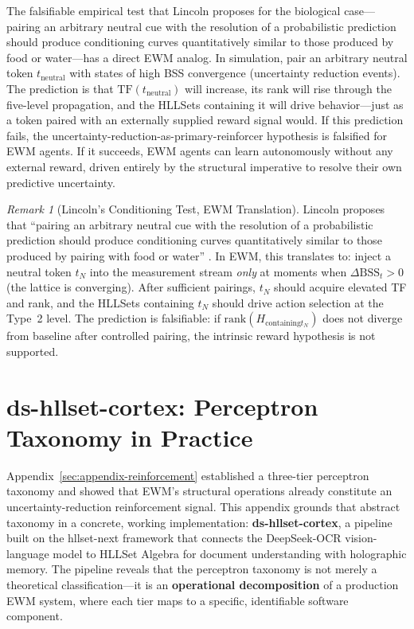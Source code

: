 \documentclass[11pt,a4paper]{article}
\theoremstyle{remark}
\newtheorem{remark}{Remark}[section]
\begin{document}
The falsifiable empirical test that Lincoln proposes for the biological
case---pairing an arbitrary neutral cue with the resolution of a probabilistic
prediction should produce conditioning curves quantitatively similar to those
produced by food or water---has a direct EWM analog. In simulation, pair an
arbitrary neutral token $t_{\text{neutral}}$ with states of high BSS
convergence (uncertainty reduction events). The prediction is that
$\text{TF}(t_{\text{neutral}})$ will increase, its rank will rise through the
five-level propagation, and the HLLSets containing it will drive behavior---just
as a token paired with an externally supplied reward signal would. If this
prediction fails, the uncertainty-reduction-as-primary-reinforcer hypothesis is
falsified for EWM agents. If it succeeds, EWM agents can learn autonomously
without any external reward, driven entirely by the structural imperative to
resolve their own predictive uncertainty.

\begin{remark}[Lincoln's Conditioning Test, EWM Translation]
Lincoln proposes that ``pairing an arbitrary neutral cue with the resolution of
a probabilistic prediction should produce conditioning curves quantitatively
similar to those produced by pairing with food or water'' \cite{lincoln2026}.
In EWM, this translates to: inject a neutral token $t_N$ into the measurement
stream \textit{only} at moments when $\Delta\text{BSS}_t > 0$ (the lattice is
converging). After sufficient pairings, $t_N$ should acquire elevated TF and
rank, and the HLLSets containing $t_N$ should drive action selection at the
Type~2 level. The prediction is falsifiable: if $\text{rank}(H_{\text{containing
} t_N})$ does not diverge from baseline after controlled pairing, the intrinsic
reward hypothesis is not supported.
\end{remark}

\section{ds-hllset-cortex: Perceptron Taxonomy in Practice}
\label{sec:appendix-cortex}

Appendix~\ref{sec:appendix-reinforcement} established a three-tier perceptron
taxonomy and showed that EWM's structural operations already constitute an
uncertainty-reduction reinforcement signal. This appendix grounds that abstract
taxonomy in a concrete, working implementation: \textbf{ds-hllset-cortex}, a
pipeline built on the hllset-next framework \cite{astesj2026} that connects
the DeepSeek-OCR vision-language model to HLLSet Algebra for document
understanding with holographic memory. The pipeline reveals that the perceptron
taxonomy is not merely a theoretical classification---it is an
\textbf{operational decomposition} of a production EWM system, where each
tier maps to a specific, identifiable software component.
\end{document}
